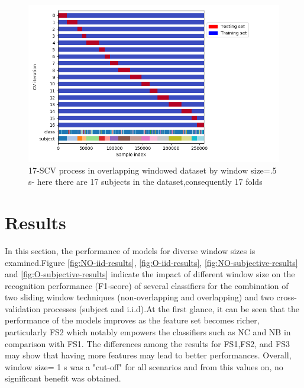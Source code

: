\begin{figure}[h]
    \centering
    \includegraphics[width=.5\textwidth]{Figures/LeaveOneGroupOut.png}
    \caption{17-SCV process in overlapping windowed dataset by window size=.5 s- here there are 17 subjects in the dataset,consequently 17 folds  }
    \label{fig:Subjective-cv}
\end{figure}


\section{Results}

In this section, the performance of models for diverse window sizes is examined.Figure \ref{fig:NO-iid-results}, \ref{fig:O-iid-results}, \ref{fig:NO-subjective-results} and \ref{fig:O-subjective-results} indicate the impact of different window size on the recognition performance (F1-score) of several classifiers for the combination of two sliding window techniques (non-overlapping and overlapping) and two cross-validation processes (subject and i.i.d).At the first glance, it can be seen that the performance of the models improves as the feature set becomes richer, particularly FS2 which notably empowers the classifiers such as NC and NB in comparison with FS1. The differences among the results for FS1,FS2, and FS3 may show that having more features may lead to better performances. Overall, window size= 1 s was a "cut-off" for all scenarios and from this values on, no significant benefit was obtained.\newline

